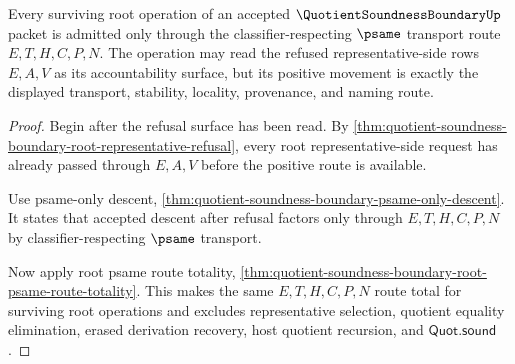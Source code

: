 \begin{theorem}
\label{thm:quotient-soundness-boundary-root-psame-transport-admission}
Every surviving root operation of an accepted $\QuotientSoundnessBoundaryUp$ packet is admitted only through the classifier-respecting $\psame$ transport route $E,T,H,C,P,N$. The operation may read the refused representative-side rows $E,A,V$ as its accountability surface, but its positive movement is exactly the displayed transport, stability, locality, provenance, and naming route.
\end{theorem}
\begin{proof}
Begin after the refusal surface has been read. By \autoref{thm:quotient-soundness-boundary-root-representative-refusal}, every root representative-side request has already passed through $E,A,V$ before the positive route is available.

Use psame-only descent, \autoref{thm:quotient-soundness-boundary-psame-only-descent}. It states that accepted descent after refusal factors only through $E,T,H,C,P,N$ by classifier-respecting $\psame$ transport.

Now apply root psame route totality, \autoref{thm:quotient-soundness-boundary-root-psame-route-totality}. This makes the same $E,T,H,C,P,N$ route total for surviving root operations and excludes representative selection, quotient equality elimination, erased derivation recovery, host quotient recursion, and $\mathsf{Quot.sound}$.
\end{proof}

